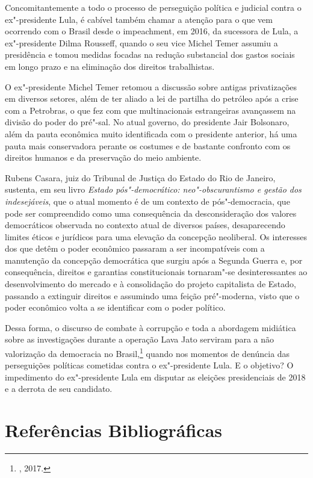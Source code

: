 Concomitantemente a todo o processo de perseguição política e judicial
contra o ex"-presidente Lula, é cabível também chamar a atenção para o
que vem ocorrendo com o Brasil desde o impeachment, em 2016, da
sucessora de Lula, a ex"-presidente Dilma Rousseff, quando o seu vice
Michel Temer assumiu a presidência e tomou medidas focadas na redução
substancial dos gastos sociais em longo prazo e na eliminação dos
direitos trabalhistas.

O ex"-presidente Michel Temer retomou a discussão sobre antigas
privatizações em diversos setores, além de ter aliado a lei de partilha
do petróleo após a crise com a Petrobras, o que fez com que
multinacionais estrangeiras avançassem na divisão do poder do pré"-sal.
No atual governo, do presidente Jair Bolsonaro, além da pauta econômica
muito identificada com o presidente anterior, há uma pauta mais
conservadora perante os costumes e de bastante confronto com os direitos
humanos e da preservação do meio ambiente.

Rubens Casara, juiz do Tribunal de Justiça do Estado do Rio de Janeiro,
sustenta, em seu livro \emph{Estado pós"-democrático: neo"-obscurantismo e
gestão dos indesejáveis}, que o atual momento é de um contexto de
pós"-democracia, que pode ser compreendido como uma consequência da
desconsideração dos valores democráticos observada no contexto atual de
diversos países, desaparecendo limites éticos e jurídicos para uma
elevação da concepção neoliberal. Os interesses dos que detêm o poder
econômico passaram a ser incompatíveis com a manutenção da concepção
democrática que surgiu após a Segunda Guerra e, por consequência,
direitos e garantias constitucionais tornaram"-se desinteressantes ao
desenvolvimento do mercado e à consolidação do projeto capitalista de
Estado, passando a extinguir direitos e assumindo uma feição
pré"-moderna, visto que o poder econômico volta a se identificar com o
poder político.

Dessa forma, o discurso de combate à corrupção e toda a abordagem
midiática sobre as investigações durante a operação Lava Jato serviram
para a não valorização da democracia no Brasil,\footnote{,
2017.} quando nos momentos de denúncia das perseguições políticas
cometidas contra o ex"-presidente Lula. E o objetivo? O impedimento do
ex"-presidente Lula em disputar as eleições presidenciais de 2018 e a
derrota de seu candidato.

\pagebreak

\section{Referências Bibliográficas}

